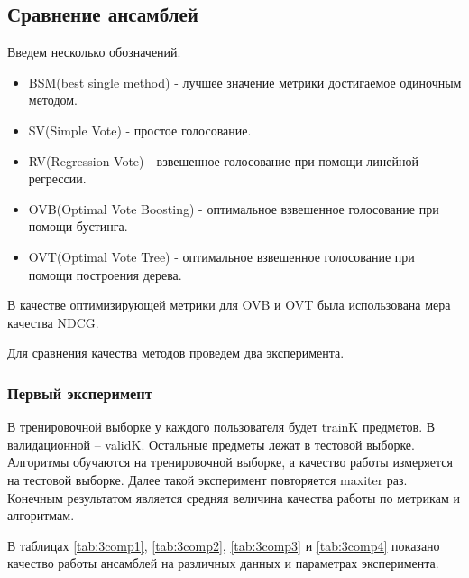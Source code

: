 \documentclass[14pt]{extarticle}
\begin{document}
\subsection{Сравнение  ансамблей}
Введем несколько обозначений.
\begin{itemize}
\item 
BSM(best single method) - лучшее значение метрики достигаемое одиночным методом.
\item 
SV(Simple Vote)  - простое голосование.
\item 
RV(Regression Vote) - взвешенное голосование при помощи линейной регрессии.
\item 
OVB(Optimal Vote Boosting) - оптимальное взвешенное голосование при помощи бустинга.
\item 
OVT(Optimal Vote Tree) - оптимальное взвешенное голосование при помощи построения дерева.
\end{itemize}

В качестве оптимизирующей метрики для OVB и OVT была использована мера качества NDCG.

Для сравнения качества методов проведем два эксперимента. 

\subsubsection{Первый эксперимент}
  
  В тренировочной выборке у каждого пользователя будет trainK предметов. В валидационной -- validK. Остальные предметы лежат в тестовой выборке. Алгоритмы обучаются на тренировочной выборке, а качество работы измеряется на тестовой выборке. Далее такой эксперимент повторяется maxiter раз. Конечным результатом является средняя величина качества работы по метрикам и алгоритмам. 

В таблицах \ref{tab:3comp1}, \ref{tab:3comp2}, \ref{tab:3comp3} и \ref{tab:3comp4} показано качество работы ансамблей на различных данных и параметрах эксперимента.
\end{document}
